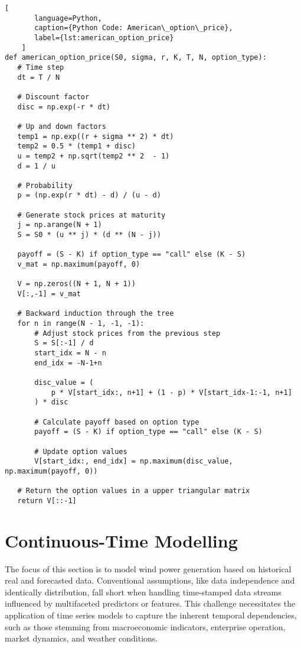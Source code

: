     \begin{lstlisting}[
       language=Python,
       caption={Python Code: American\_option\_price},
       label={lst:american_option_price}
    ]
def american_option_price(S0, sigma, r, K, T, N, option_type):
   # Time step
   dt = T / N

   # Discount factor
   disc = np.exp(-r * dt)

   # Up and down factors
   temp1 = np.exp((r + sigma ** 2) * dt)
   temp2 = 0.5 * (temp1 + disc)
   u = temp2 + np.sqrt(temp2 ** 2  - 1)
   d = 1 / u

   # Probability
   p = (np.exp(r * dt) - d) / (u - d)

   # Generate stock prices at maturity
   j = np.arange(N + 1)
   S = S0 * (u ** j) * (d ** (N - j))

   payoff = (S - K) if option_type == "call" else (K - S)
   v_mat = np.maximum(payoff, 0)

   V = np.zeros((N + 1, N + 1))
   V[:,-1] = v_mat

   # Backward induction through the tree
   for n in range(N - 1, -1, -1):
       # Adjust stock prices from the previous step
       S = S[:-1] / d
       start_idx = N - n
       end_idx = -N-1+n

       disc_value = (
           p * V[start_idx:, n+1] + (1 - p) * V[start_idx-1:-1, n+1]
       ) * disc

       # Calculate payoff based on option type
       payoff = (S - K) if option_type == "call" else (K - S)

       # Update option values
       V[start_idx:, end_idx] = np.maximum(disc_value, np.maximum(payoff, 0))

   # Return the option values in a upper triangular matrix
   return V[::-1]
   \end{lstlisting}


    

\section{Continuous-Time Modelling}
    \label{sec:cont_time}

    The focus of this section is to model wind power generation based on historical real and forecasted data.
    Conventional assumptions, like data independence and identically distribution, fall short when handling time-stamped
    data streams influenced by multifaceted predictors or features.
    This challenge necessitates the application of time series models to capture the inherent temporal dependencies,
    such as those stemming from macroeconomic indicators, enterprise operation, market dynamics, and weather conditions.\\

